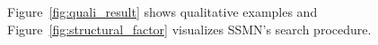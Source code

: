 \documentclass[10pt,twocolumn,letterpaper]{article}
\newcommand{\note}[1]{\textcolor{red}{#1}}
\newcommand{\choi}[1]{\textcolor{blue}{Choi:#1}}
\begin{document}
Figure~\ref{fig:quali_result} shows qualitative examples and Figure~\ref{fig:structural_factor} visualizes SSMN's search procedure.
\end{document}
